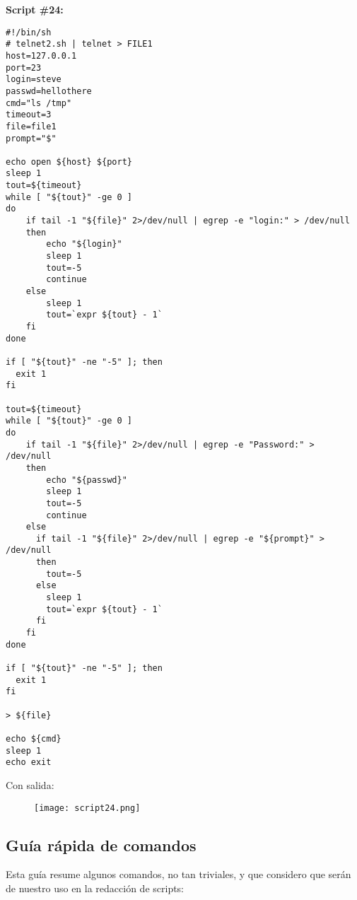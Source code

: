 \documentclass[a4paper]{article}
\begin{document}
\textbf{Script \#24:}
\begin{verbatim}
#!/bin/sh
# telnet2.sh | telnet > FILE1 
host=127.0.0.1
port=23
login=steve
passwd=hellothere
cmd="ls /tmp"
timeout=3
file=file1
prompt="$"

echo open ${host} ${port}
sleep 1
tout=${timeout}
while [ "${tout}" -ge 0 ]
do
    if tail -1 "${file}" 2>/dev/null | egrep -e "login:" > /dev/null
    then
        echo "${login}"
        sleep 1
        tout=-5
        continue
    else
        sleep 1
        tout=`expr ${tout} - 1`
    fi
done

if [ "${tout}" -ne "-5" ]; then
  exit 1
fi

tout=${timeout}
while [ "${tout}" -ge 0 ]
do
    if tail -1 "${file}" 2>/dev/null | egrep -e "Password:" > /dev/null
    then
        echo "${passwd}"
        sleep 1
        tout=-5
        continue
    else
      if tail -1 "${file}" 2>/dev/null | egrep -e "${prompt}" > /dev/null
      then
        tout=-5
      else
        sleep 1
        tout=`expr ${tout} - 1`
      fi
    fi
done

if [ "${tout}" -ne "-5" ]; then
  exit 1
fi

> ${file}

echo ${cmd}
sleep 1
echo exit
\end{verbatim}

Con salida:
 \begin{figure}[h!]
  \texttt{[image: script24.png]}
  \centering
  \label{fig:37}
\end{figure}

\subsection{Guía rápida de comandos}
Esta guía resume algunos comandos, no tan triviales, y que considero que serán de nuestro uso en la redacción de scripts: 
\end{document}
